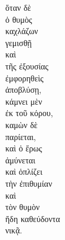{\large
\begin{greek}
\noindent ὅταν δὲ \\
ὁ θυμὸς \\
\tabto{2em} καχλάζων \\
γεμισθῇ \\
καὶ \\
\tabto{2em} τῆς ἐξουσίας \\
ἐμφορηθεὶς \\
ἀποβλύσῃ, \\
κάμνει μὲν \\
\tabto{2em} ἐκ τοῦ κόρου, \\
καμὼν δὲ \\
παρίεται, \\
καὶ ὁ ἔρως \\
ἀμύνεται \\
καὶ ὁπλίζει \\
τὴν ἐπιθυμίαν \\
καὶ \\
τὸν θυμὸν \\
\tabto{2em} ἤδη καθεύδοντα \\
νικᾷ.\\

\end{greek}
}

